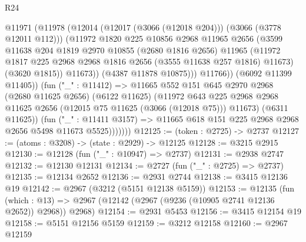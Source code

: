 \begin{lexlean}{R24}
\begin{coremodule}
                        @11971
                          (@11978
                            (@12014 (@12017 (@3066 (@12018 @204))) (@3066 (@3778 @12011 @112)))
                            (@11972
                              @1820
                              @225
                              @10856
                              @2968
                              @11965
                              @2656
                              (@3599
                                @11638
                                @204
                                @1819
                                @2970
                                @10855
                                (@2680 @1816 @2656)
                                @11965
                                (@11972
                                  @1817
                                  @225
                                  @2968
                                  @2968
                                  @1816
                                  @2656
                                  (@3555 @11638 @257 @1816)
                                  @11673)
                                (@3620 @1815))
                              @11673))
                          (@4387 @11878 @10875)))
                      @11766))
                  (@6092 @11399 @11405))
                (fun ("_" : @11412) =>
                @11665
                  @552
                  @151
                  @645
                  @2970
                  @2968
                  (@2680 @11625 @2656)
                  (@6122 @11625)
                  (@11972
                    @643
                    @225
                    @2968
                    @2968
                    @11625
                    @2656
                    (@12015 @75 @11625 (@3066 (@12018 @75)))
                    @11673)
                  (@6311 @11625))
                (fun ("_" : @11411 @3157) =>
                @11665 @618 @151 @225 @2968 @2968 @2656 @5498 @11673 @5525)))))))
@12125 := (token : @2725) -> @2737
@12127 := (atoms : @3208) -> (state : @2929) -> @12125
@12128 := @3215 @2915
@12130 := @12128 (fun ("_" : @10947) => @2737)
@12131 := @2938 @2747
@12132 := @12130 @12131
@12134 := @2727 (fun ("_" : @2725) => @2737)
@12135 := @12134 @2652
@12136 := @2931 @2744
@12138 := @3415 @12136 @19
@12142 := @2967 (@3212 (@5151 @12138 @5159))
@12153 := @12135
    (fun (which : @13) => @2967 (@12142 (@2967 (@9236 (@10905 @2741 @12136 @2652)) @2968)) @2968)
@12154 := @2931 @5453
@12156 := @3415 @12154 @19
@12158 := @5151 @12156 @5159
@12159 := @3212 @12158
@12160 := @2967 @12159

\end{coremodule}
\end{lexlean}
